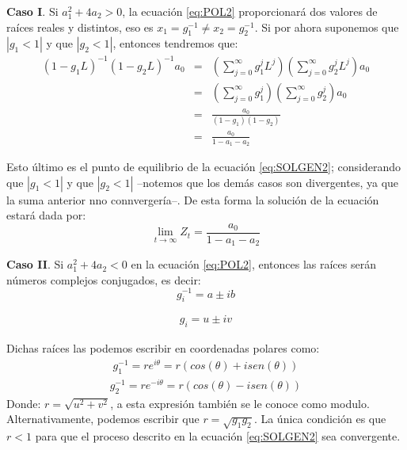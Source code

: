 \documentclass[
]{book}
\begin{document}
\textbf{Caso I}. Si \(a^2_1 + 4 a_2 > 0\), la ecuación \eqref{eq:POL2} proporcionará dos valores de raíces reales y distintos, eso es \(x_1 = g^{-1}_1 \neq x_2 = g^{-1}_2\). Si por ahora suponemos que \(|{g_1} < 1|\) y que \(|{g_2} < 1|\), entonces tendremos que:
\begin{eqnarray}
    (1 - g_1 L)^{-1} (1 - g_2 L)^{-1} a_0 & =&  \left( \sum^{\infty}_{j = 0}{g^j_1 L^j} \right) \left( \sum^{\infty}_{j = 0}{g^j_2 L^j} \right) a_0 \nonumber \\
    & = & \left( \sum^{\infty}_{j = 0}{g^j_1} \right) \left( \sum^{\infty}_{j = 0}{g^j_2} \right) a_0 \nonumber \\
    & = & \frac{a_0}{(1 - g_1)(1 - g_2)} \nonumber \\
    & = & \frac{a_0}{1 - a_1 - a_2}
    \label{eq:eqcaracteristica6}
\end{eqnarray}

Esto último es el punto de equilibrio de la ecuación \eqref{eq:SOLGEN2}; considerando que \(|{g_1} < 1|\) y que \(|{g_2} < 1|\) --notemos que los demás casos son divergentes, ya que la suma anterior nno connvergería--. De esta forma la solución de la ecuación estará dada por:
\begin{equation}
    \lim_{t \to \infty} Z_t = \frac{a_0}{1 - a_1 - a_2}
    \label{eq:Conver}
\end{equation}

\textbf{Caso II}. Si \(a_1^2 + 4a_2 < 0\) en la ecuación \eqref{eq:POL2}, entonces las raíces serán números complejos conjugados, es decir:
\begin{equation}
g_i^{-1}=a \pm ib
\label{eq:Conver1}
\end{equation}

\begin{eqnarray}
    g_i  =  u \pm iv 
    \label{eq:Conver2}
\end{eqnarray}

Dichas raíces las podemos escribir en coordenadas polares como:
\begin{eqnarray}
    g_1^{-1} = r e^{i \theta} = r (cos(\theta) + i sen(\theta))
    \label{eq:Conver3}
\end{eqnarray}
\begin{eqnarray}
    g_2^{-1}  =  r e^{-i \theta} = r (cos(\theta) - i sen(\theta))
    \label{eq:Conver4}
\end{eqnarray}
Donde: \(r = \sqrt{u^2 + v^2}\), a esta expresión también se le conoce como modulo. Alternativamente, podemos escribir que \(r = \sqrt{g_1 g_2}\). La única condición es que \(r < 1\) para que el proceso descrito en la ecuación \eqref{eq:SOLGEN2} sea convergente.
\end{document}
